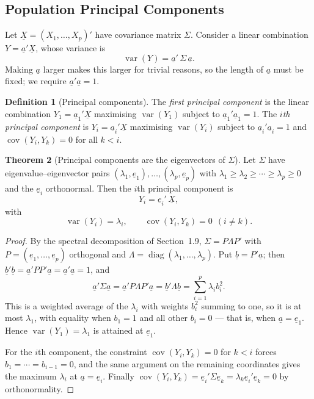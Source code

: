 \documentclass[11pt,a4paper]{article}
\theoremstyle{definition}
\newtheorem{thm}{Theorem}[section]
\newtheorem{defn}[thm]{Definition}
\begin{document}
\subsection{Population Principal Components}

Let $\underline{X} = (X_1,\dots,X_p)'$ have covariance matrix $\Sigma$. Consider
a linear combination $Y = \underline{a}'\underline{X}$, whose variance is
$$\operatorname{var}(Y) = \underline{a}'\,\Sigma\,\underline{a}.$$
Making $\underline{a}$ larger makes this larger for trivial reasons, so the
length of $\underline{a}$ must be fixed; we require $\underline{a}'\underline{a}=1$.

\begin{defn}[Principal components]
The \emph{first principal component} is the linear combination
$Y_1 = \underline{a}_1'\underline{X}$ maximising
$\operatorname{var}(Y_1)$ subject to $\underline{a}_1'\underline{a}_1 = 1$. The
\emph{$i$th principal component} is
$Y_i = \underline{a}_i'\underline{X}$ maximising $\operatorname{var}(Y_i)$
subject to $\underline{a}_i'\underline{a}_i = 1$ and
$\operatorname{cov}(Y_i, Y_k) = 0$ for all $k<i$.
\end{defn}

\begin{thm}[Principal components are the eigenvectors of $\Sigma$]
\label{thm:pca}
Let $\Sigma$ have eigenvalue--eigenvector pairs
$(\lambda_1,\underline{e}_1),\dots,(\lambda_p,\underline{e}_p)$ with
$\lambda_1\geq\lambda_2\geq\cdots\geq\lambda_p\geq0$ and the $\underline{e}_i$
orthonormal. Then the $i$th principal component is
$$Y_i = \underline{e}_i'\,\underline{X},$$
with
$$\operatorname{var}(Y_i) = \lambda_i,
\qquad
\operatorname{cov}(Y_i,Y_k) = 0 \ \ (i\neq k).$$
\end{thm}

\begin{proof}
By the spectral decomposition of Section~1.9, $\Sigma = P\Lambda P'$ with
$P = (\underline{e}_1,\dots,\underline{e}_p)$ orthogonal and
$\Lambda = \operatorname{diag}(\lambda_1,\dots,\lambda_p)$. Put
$\underline{b} = P'\underline{a}$; then $\underline{b}'\underline{b} =
\underline{a}'PP'\underline{a} = \underline{a}'\underline{a} = 1$, and
$$\underline{a}'\Sigma\underline{a}
= \underline{a}'P\Lambda P'\underline{a}
= \underline{b}'\Lambda\underline{b}
= \sum^{p}_{i=1}\lambda_i b_i^{2}.$$
This is a weighted average of the $\lambda_i$ with weights $b_i^{2}$ summing to
one, so it is at most $\lambda_1$, with equality when $b_1=1$ and all other
$b_i=0$ --- that is, when $\underline{a}=\underline{e}_1$. Hence
$\operatorname{var}(Y_1)=\lambda_1$ is attained at $\underline{e}_1$.

For the $i$th component, the constraint $\operatorname{cov}(Y_i,Y_k)=0$ for
$k<i$ forces $b_1=\cdots=b_{i-1}=0$, and the same argument on the remaining
coordinates gives the maximum $\lambda_i$ at $\underline{a}=\underline{e}_i$.
Finally
$\operatorname{cov}(Y_i,Y_k)=\underline{e}_i'\Sigma\underline{e}_k
=\lambda_k\underline{e}_i'\underline{e}_k = 0$ by orthonormality.
\end{proof}
\end{document}

